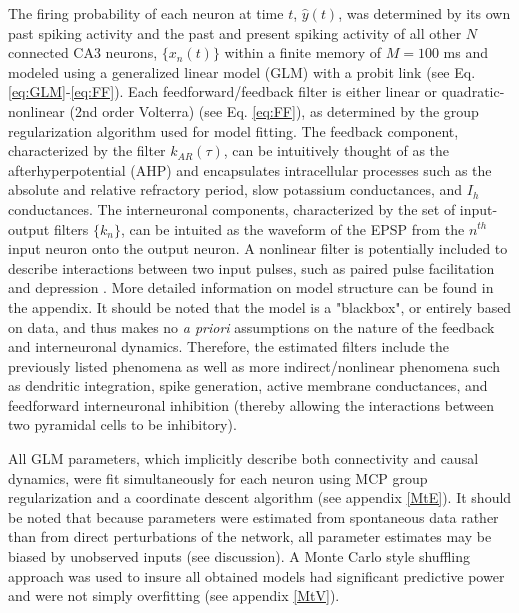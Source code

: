 \documentclass[11pt,a4paper,final]{article}
\begin{document}

The firing probability of each neuron at time $t$, $\hat{y}(t)$, was determined by its own past spiking activity and the past and present spiking activity of all other $N$ connected CA3 neurons, $\{x_n(t)\}$ within a finite memory of $M=100$ ms and modeled using a generalized linear model (GLM) with a probit link (see Eq. \ref{eq:GLM}-\ref{eq:FF}).
Each feedforward/feedback filter is either linear or quadratic-nonlinear (2nd order Volterra)  (see Eq. \ref{eq:FF}), as determined by the group regularization algorithm used for model fitting.
The feedback component, characterized by the filter $k_{AR}(\tau)$, can be intuitively thought of as the afterhyperpotential (AHP) \citep{spruston07} and encapsulates intracellular processes such as the absolute and relative refractory period, slow potassium conductances, and $I_h$ conductances.
The interneuronal components, characterized by the set of input-output filters $\{k_n\}$, can be intuited as the waveform of the EPSP from the $n^{th}$ input neuron onto the output neuron.
A nonlinear filter is potentially included to describe interactions between two input pulses, such as paired pulse facilitation and depression \citep{song09par1,sandler15}.
More detailed information on model structure can be found in the appendix.
It should be noted that the model is a "blackbox", or entirely based on data, and thus makes no \textit{a priori} assumptions on the nature of the feedback and interneuronal dynamics.
Therefore, the estimated filters include the previously listed phenomena as well as more indirect/nonlinear phenomena such as dendritic integration, spike generation, active membrane conductances, and feedforward interneuronal inhibition (thereby allowing the interactions between two pyramidal cells to be inhibitory).

All GLM parameters, which implicitly describe both connectivity and causal dynamics, were fit simultaneously for each neuron using MCP group regularization and a coordinate descent algorithm (see appendix \ref{MtE}).
It should be noted that because parameters were estimated from spontaneous data rather than from direct perturbations of the network, all parameter estimates may be biased by unobserved inputs (see discussion).
A Monte Carlo style shuffling approach was used to insure all obtained models had significant predictive power and were not simply overfitting (see appendix \ref{MtV}).
\end{document}
